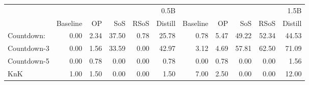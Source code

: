 \begin{tabular}{lrrrrrrrrrr}
\toprule
 & \multicolumn{5}{r}{0.5B} & \multicolumn{5}{r}{1.5B} \\
 & Baseline & OP & SoS & RSoS & Distill & Baseline & OP & SoS & RSoS & Distill \\
\midrule
Countdown: & 0.00 & 2.34 & 37.50 & 0.78 & 25.78 & 0.78 & 5.47 & 49.22 & 52.34 & 44.53 \\
Countdown-3 & 0.00 & 1.56 & 33.59 & 0.00 & 42.97 & 3.12 & 4.69 & 57.81 & 62.50 & 71.09 \\
Countdown-5 & 0.00 & 0.78 & 0.00 & 0.00 & 0.78 & 0.00 & 0.78 & 0.00 & 0.00 & 1.56 \\
KnK & 1.00 & 1.50 & 0.00 & 0.00 & 1.50 & 7.00 & 2.50 & 0.00 & 0.00 & 12.00 \\
\bottomrule
\end{tabular}
